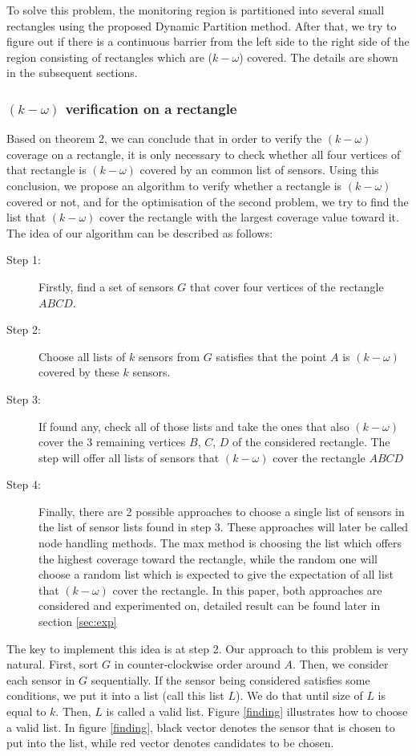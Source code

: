 To solve this problem, the monitoring region is partitioned into several small rectangles using the proposed Dynamic Partition method. After that, we try to figure out if there is a continuous barrier from the left side to the right side of the region consisting of rectangles which are ($k-\omega$) covered. The details are shown in the subsequent sections.

\subsubsection{$(k-\omega)$ verification on a rectangle}

Based on theorem 2, we can conclude that in order to verify the $(k-\omega)$ coverage on a rectangle, it is only necessary to check whether all four vertices of that rectangle is $(k-\omega)$ covered by an common list of sensors. Using this conclusion, we propose an algorithm to verify whether a rectangle is $(k-\omega)$ covered or not, and for the optimisation of the second problem, we try to find the list that $(k-\omega)$ cover the rectangle with the largest coverage value toward it. 
The idea of our algorithm can be described as follows:
\begin{description}
	\item[Step 1:] Firstly, find a set of sensors $G$ that cover four vertices of the rectangle $ ABCD $.
	\item[Step 2:] Choose all lists of $k$ sensors from $G$ satisfies that the point $A$ is $(k-\omega)$ covered by these $k$ sensors.
	\item[Step 3:] If found any, check all of those lists and take the ones that also $(k-\omega)$ cover the 3 remaining vertices $B$, $C$, $D$ of the considered rectangle. The step will offer all lists of sensors that $(k-\omega)$ cover the rectangle $ABCD$
	\item[Step 4:] Finally, there are 2 possible approaches to choose a single list of sensors in the list of sensor lists found in step 3. These approaches will later be called node handling methods. The max method is choosing the list which offers the highest coverage toward the rectangle, while the random one will choose a random list which is expected to give the expectation of all list that $(k-\omega)$ cover the rectangle. In this paper, both approaches are considered and experimented on, detailed result can be found later in section \ref{sec:exp}
\end{description}
The key to implement this idea is at step 2. Our approach to this problem is very natural. First, sort $G$ in counter-clockwise order around $A$. Then, we consider each sensor in $G$ sequentially. If the sensor being considered satisfies some conditions, we put it into a list (call this list $L$). We do that until size of $L$ is equal to $k$. Then, $L$ is called a valid list. Figure \ref{finding} illustrates how to choose a valid list. In figure \ref{finding}, black vector denotes the sensor that is chosen to put into the list, while red vector denotes candidates to be chosen.

